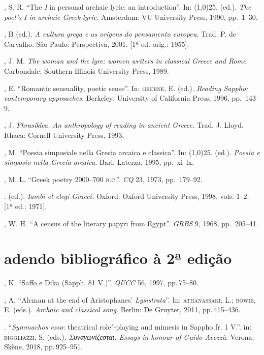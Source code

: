 \begin{bibliohedra}
, S. R. “The \textit{I} in personal archaic lyric: an
introduction”. In: \line(1,0){25}. (ed.). \textit{The poet’s I in archaic Greek
lyric.} Amsterdam: VU University Press, 1990, pp.~1--30.

, B (ed.). \textit{A cultura grega e as origens do pensamento
europeu.} Trad. P. de Carvalho. São Paulo: Perspectiva, 2001. [1ª ed. orig.:
1955].

, J. M. \textit{The woman and the lyre: women writers in
classical Greece and Rome}. Carbondale: Southern Illinois University Press,
1989.

, E. “Romantic sensuality, poetic sense”. In: \textsc{greene}, E.
(ed.). \textit{Reading Sappho: contemporary approaches.} Berkeley: University
of California Press, 1996, pp.~143--9.

, J. \textit{Phrasiklea. An anthropology of reading in ancient
Greece.} Trad. J. Lloyd. Ithaca: Cornell University Press, 1993.

, M. “Poesia simposiale nella Grecia arcaica e classica”. In:
\line(1,0){25}. (ed.). \textit{Poesia e simposio nella Grecia arcaica.}
Bari: Laterza, 1995, pp.~xi--lx.

, M. L. “Greek poetry 2000--700 \textsc{b.c.”.} \textit{CQ} 23, 1973,
pp.~179--92.

\titidem. (ed.). \textit{Iambi et elegi Graeci.} Oxford: Oxford University
Press, 1998. vols. 1--2. [1ª ed.: 1971].

, W. H. “A census of the literary papyri from Egypt”.
\textit{GRBS} 9, 1968, pp.~205--41.



\section*{adendo bibliográfico à 2ª edição}

, K. “Saffo e Dika (Sapph. 81 V.)”. \textit{QUCC} 56, 1997, pp.\,75--80.

, A. “Alcman at the end of Aristophanes' \textit{Lysistrata}”. In: \textsc{athanassaki}, L.; \textsc{bowie}, E. (eds.). \textit{Archaic and classical song}. Berlin: De Gruyter, 2011, pp.\,415--436.

\titidem.  “\textit{Symmachos esso}: theatrical role"-playing and mimesis in Sappho fr. 1 V.”. in: \textsc{biggliazzi}, S. (eds.). \textit{Συναγωνίζεσται. Essays in honour of Guido Avezzù}. Verona: Skène, 2018, pp.\,925--951.



\end{bibliohedra}
